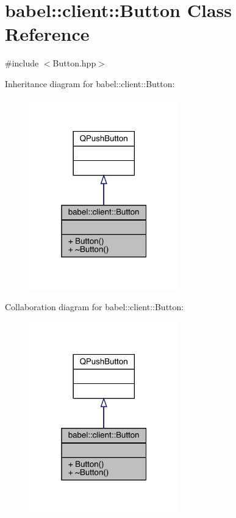 \hypertarget{classbabel_1_1client_1_1_button}{}\section{babel\+:\+:client\+:\+:Button Class Reference}
\label{classbabel_1_1client_1_1_button}


{\ttfamily \#include $<$Button.\+hpp$>$}



Inheritance diagram for babel\+:\+:client\+:\+:Button\+:\nopagebreak
\begin{figure}[H]
\begin{center}
\leavevmode
\includegraphics[width=184pt]{classbabel_1_1client_1_1_button__inherit__graph}
\end{center}
\end{figure}


Collaboration diagram for babel\+:\+:client\+:\+:Button\+:\nopagebreak
\begin{figure}[H]
\begin{center}
\leavevmode
\includegraphics[width=184pt]{classbabel_1_1client_1_1_button__coll__graph}
\end{center}
\end{figure}
